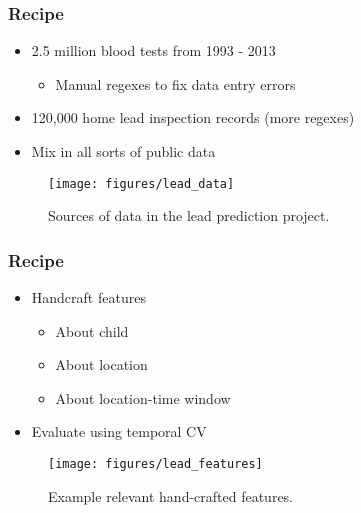 \documentclass[10pt,mathserif]{beamer}
\begin{document}
\begin{frame}
  \frametitle{Recipe}
  \begin{itemize}
  \item 2.5 million blood tests from 1993 - 2013
    \begin{itemize}
    \item Manual regexes to fix data entry errors
    \end{itemize}
  \item 120,000 home lead inspection records (more regexes)
  \item Mix in all sorts of public data
  \end{itemize}
  \begin{figure}[ht]
    \centering
    \texttt{[image: figures/lead\_data]}
    \caption{Sources of data in the lead prediction project.\label{fig:label} }
\end{figure}

\end{frame}

\begin{frame}
  \frametitle{Recipe}
  \begin{itemize}
  \item Handcraft features
    \begin{itemize}
    \item About child
    \item About location
    \item About location-time window
    \end{itemize}
  \item Evaluate using temporal CV
  \end{itemize}
  \begin{figure}[ht]
    \centering
    \texttt{[image: figures/lead\_features]}
    \caption{Example relevant hand-crafted features.\label{fig:label} }
\end{figure}
\end{frame}

\end{document}

